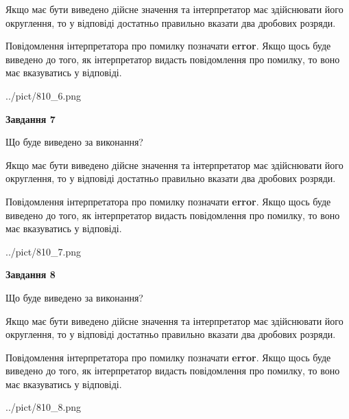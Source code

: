 \documentclass[12pt, ukrainian]{article}
\begin{document}
{\begin {Large}
Якщо має бути виведено дійсне значення та інтерпретатор має здійснювати його округлення, 
то у відповіді достатньо правильно вказати два дробових розряди.

Повідомлення інтерпретатора про помилку позначати \textbf{error}.
Якщо щось буде виведено до того, як інтерпретатор видасть повідомлення про помилку, 
то воно має вказуватись у відповіді. \par

\begin{center}
	{../pict/810_6.png}
\end{center}
\newpage

{\begin {center}\textbf{Завдання 7}\end {center}}\par
Що буде виведено за виконання? \par

Якщо має бути виведено дійсне значення та інтерпретатор має здійснювати його округлення, 
то у відповіді достатньо правильно вказати два дробових розряди.

Повідомлення інтерпретатора про помилку позначати \textbf{error}.
Якщо щось буде виведено до того, як інтерпретатор видасть повідомлення про помилку, 
то воно має вказуватись у відповіді. \par

\begin{center}
	{../pict/810_7.png}
\end{center}
\newpage

{\begin {center}\textbf{Завдання 8}\end {center}}\par
Що буде виведено за виконання? \par

Якщо має бути виведено дійсне значення та інтерпретатор має здійснювати його округлення, 
то у відповіді достатньо правильно вказати два дробових розряди.

Повідомлення інтерпретатора про помилку позначати \textbf{error}.
Якщо щось буде виведено до того, як інтерпретатор видасть повідомлення про помилку, 
то воно має вказуватись у відповіді. \par

\begin{center}
	{../pict/810_8.png}
\end{center}
\newpage


\end{Large}}
\end{document}
